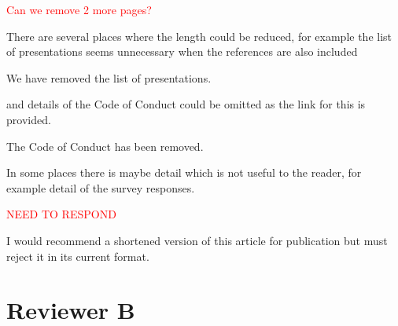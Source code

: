 \documentclass[11pt]{article}
\begin{document}
\textcolor{red}{Can we remove 2 more pages?}

\begin{quoting}
There are several places where the length could be reduced, for example the list of presentations seems unnecessary when the references are also included 

\end{quoting}

We have removed the list of presentations.

\begin{quoting}

and details of the Code of Conduct could be omitted as the link for this is provided. 

\end{quoting}

The Code of Conduct has been removed.

\begin{quoting}

 In some places there is maybe detail which is not useful to the reader, for example detail of the survey responses.
 
\end{quoting}

\textcolor{red}{NEED TO RESPOND}

\begin{quoting}
I would recommend a shortened version of this article for publication but must reject it in its current format.
\end{quoting}


\section*{Reviewer B}
\end{document}
